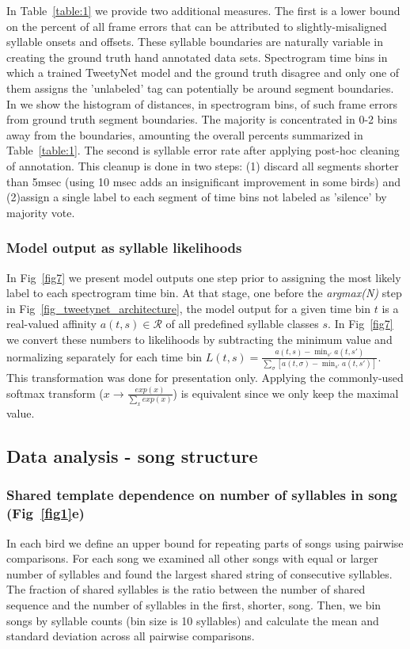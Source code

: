 \documentclass[10pt,letterpaper]{article}
\begin{document}
In Table~\ref{table:1} we provide two additional measures. The first is a lower bound on the percent of all frame errors that can be attributed to slightly-misaligned syllable onsets and offsets. 
These syllable boundaries are naturally variable in creating the ground truth hand annotated data sets. Spectrogram time bins in which a trained TweetyNet model and the ground truth disagree and only one of them assigns the 'unlabeled' tag can potentially be around segment boundaries. In  we show the histogram of distances, in spectrogram bins, of such frame errors from ground truth segment boundaries. The majority is concentrated in 0-2 bins away from the boundaries, amounting the overall percents summarized in Table~\ref{table:1}. The second is syllable error rate after applying post-hoc cleaning of annotation. This cleanup is done in two steps: (1) discard all segments shorter than 5msec (using 10 msec adds an insignificant improvement in some birds) and (2)assign a single label to each segment of time bins not labeled as 'silence' by majority vote.

\subsubsection*{Model output as syllable likelihoods}
In Fig~\ref{fig7} we present model outputs one step prior to assigning the most likely label to each spectrogram time bin. At that stage, one before the \textit{argmax(N)} step in Fig~\ref{fig_tweetynet_architecture}, the model output for a given time bin $t$ is a real-valued affinity $a(t,s)\in\mathcal{R}$ of all predefined syllable classes $s$. In Fig~\ref{fig7} we convert these numbers to likelihoods by subtracting the minimum value and normalizing separately for each time bin $L(t,s)=\frac{a(t,s)-\min_{s'}a(t,s')}{\sum_{\sigma}[a(t,\sigma)-\min_{s'}a(t,s')]}$. This transformation was done for presentation only. Applying the commonly-used softmax transform ($x\rightarrow\frac{exp(x)}{\sum_xexp(x)}$) is equivalent since we only keep the maximal value.

\subsection*{Data analysis - song structure} 
\subsubsection*{Shared template dependence on number of syllables in song (Fig~\ref{fig1}e)}
In each bird we define an upper bound for repeating parts of songs using pairwise comparisons. For each song we examined all other songs with equal or larger number of syllables and found the largest shared string of consecutive syllables. The fraction of shared syllables is the ratio between the number of shared sequence and the number of syllables in the first, shorter, song. Then, we bin songs by syllable counts (bin size is 10 syllables) and calculate the mean and standard deviation across all pairwise comparisons.
\end{document}
